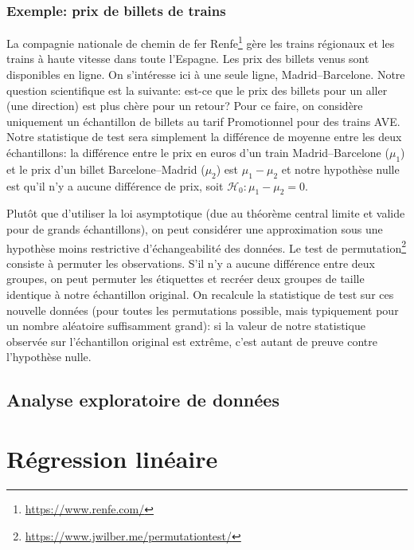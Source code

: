 \documentclass[
  11pt,
  letterpaper,
]{book}
\renewcommand{\href}[2]{#2\footnote{\url{#1}}}
\begin{document}
\hypertarget{exemple-prix-de-billets-de-trains}{%
\subsection{Exemple: prix de billets de trains}\label{exemple-prix-de-billets-de-trains}}

La compagnie nationale de chemin de fer \href{https://www.renfe.com/}{Renfe} gère les trains régionaux et les trains à haute vitesse dans toute l'Espagne. Les prix des billets venus sont disponibles en ligne. On s'intéresse ici à une seule ligne, Madrid--Barcelone. Notre question scientifique est la suivante: est-ce que le prix des billets pour un aller (une direction) est plus chère pour un retour? Pour ce faire, on considère uniquement un échantillon de billets au tarif Promotionnel pour des trains AVE. Notre statistique de test sera simplement la différence de moyenne entre les deux échantillons: la différence entre le prix en euros d'un train Madrid--Barcelone (\(\mu_1\)) et le prix d'un billet Barcelone--Madrid (\(\mu_2\)) est \(\mu_1-\mu_2\) et notre hypothèse nulle est qu'il n'y a aucune différence de prix, soit \(\mathscr{H}_0: \mu_1-\mu_2=0\).

Plutôt que d'utiliser la loi asymptotique (due au théorème central limite et valide pour de grands échantillons), on peut considérer une approximation sous une hypothèse moins restrictive d'échangeabilité des données. Le \href{https://www.jwilber.me/permutationtest/}{test de permutation} consiste à permuter les observations. S'il n'y a aucune différence entre deux groupes, on peut permuter les étiquettes et recréer deux groupes de taille identique à notre échantillon original. On recalcule la statistique de test sur ces nouvelle données (pour toutes les permutations possible, mais typiquement pour un nombre aléatoire suffisamment grand): si la valeur de notre statistique observée sur l'échantillon original est extrême, c'est autant de preuve contre l'hypothèse nulle.

\hypertarget{analyse-exploratoire-de-donnuxe9es}{%
\section{Analyse exploratoire de données}\label{analyse-exploratoire-de-donnuxe9es}}

\hypertarget{regression-lineaire}{%
\chapter{Régression linéaire}\label{regression-lineaire}}
\end{document}

